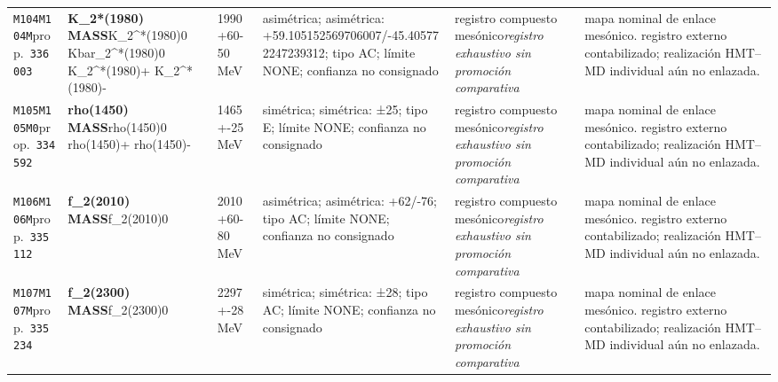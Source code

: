 \begin{landscape}
\begin{longtable}{L{1.85cm}L{4.45cm}L{2.35cm}L{4.05cm}L{3.35cm}L{7.15cm}}
\texttt{M104}\newline \texttt{M104M}\newline prop.\ \texttt{336003} & \textbf{K\_\allowbreak{}2*(1980) MASS}\newline K\_\allowbreak{}2\textasciicircum{}*(1980)0 \textbar{}\allowbreak{} Kbar\_\allowbreak{}2\textasciicircum{}*(1980)0 \textbar{}\allowbreak{} K\_\allowbreak{}2\textasciicircum{}*(1980)+ \textbar{}\allowbreak{} K\_\allowbreak{}2\textasciicircum{}*(1980)- & 1990+60-50\,MeV & asimétrica; asimétrica: +59.105152569706007/-45.405772247239312; tipo AC; límite NONE; confianza no consignado & registro compuesto mesónico\newline \emph{registro exhaustivo sin promoción comparativa} & mapa nominal de enlace mesónico. registro externo contabilizado; realización HMT--MD individual aún no enlazada. \\
\texttt{M105}\newline \texttt{M105M0}\newline prop.\ \texttt{334592} & \textbf{rho(1450) MASS}\newline rho(1450)0 \textbar{}\allowbreak{} rho(1450)+ \textbar{}\allowbreak{} rho(1450)- & 1465+-25\,MeV & simétrica; simétrica: ±25; tipo E; límite NONE; confianza no consignado & registro compuesto mesónico\newline \emph{registro exhaustivo sin promoción comparativa} & mapa nominal de enlace mesónico. registro externo contabilizado; realización HMT--MD individual aún no enlazada. \\
\texttt{M106}\newline \texttt{M106M}\newline prop.\ \texttt{335112} & \textbf{f\_\allowbreak{}2(2010) MASS}\newline f\_\allowbreak{}2(2010)0 & 2010+60-80\,MeV & asimétrica; asimétrica: +62/-76; tipo AC; límite NONE; confianza no consignado & registro compuesto mesónico\newline \emph{registro exhaustivo sin promoción comparativa} & mapa nominal de enlace mesónico. registro externo contabilizado; realización HMT--MD individual aún no enlazada. \\
\texttt{M107}\newline \texttt{M107M}\newline prop.\ \texttt{335234} & \textbf{f\_\allowbreak{}2(2300) MASS}\newline f\_\allowbreak{}2(2300)0 & 2297+-28\,MeV & simétrica; simétrica: ±28; tipo AC; límite NONE; confianza no consignado & registro compuesto mesónico\newline \emph{registro exhaustivo sin promoción comparativa} & mapa nominal de enlace mesónico. registro externo contabilizado; realización HMT--MD individual aún no enlazada. \\

\end{longtable}
\end{landscape}
